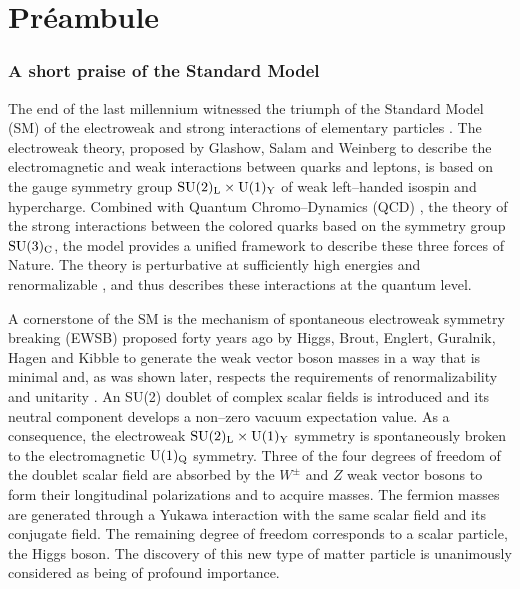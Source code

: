 \setcounter{section}{-1} 

\section{\hspace*{-.5cm} Pr\'eambule}

\subsubsection*{A short praise of the Standard Model}

The end of the last millennium witnessed the triumph of the Standard Model (SM)
of the electroweak and strong interactions of elementary particles
\cite{GSW,QCD}.  The electroweak theory, proposed by Glashow, Salam and
Weinberg \cite{GSW} to describe the electromagnetic \cite{QED} and weak
\cite{WEAK} interactions between quarks and leptons, is based on the gauge
symmetry group ${\rm SU(2)_L \times U(1)_Y}$ of weak left--handed isospin and
hypercharge. Combined with Quantum Chromo--Dynamics (QCD) \cite{QCD}, the
theory of the strong interactions between the colored quarks based on the 
symmetry group ${\rm SU(3)_C}$, the model provides a unified framework to
describe these three forces of Nature. The theory is perturbative at
sufficiently high energies \cite{QCD} and renormalizable \cite{RENORM}, and
thus describes these interactions at the quantum level.\s

A cornerstone of the SM is the mechanism of spontaneous electroweak symmetry
breaking (EWSB) proposed forty years ago by Higgs, Brout, Englert, Guralnik,
Hagen and Kibble \cite{Higgs} to generate the weak vector boson masses in a way
that is minimal and, as was shown later, respects the requirements of
renormalizability \cite{RENORM} and unitarity \cite{UNITARITY}.  An SU(2)
doublet of complex scalar fields is introduced and its neutral component
develops a non--zero vacuum expectation value. As a consequence, the
electroweak ${\rm SU(2)_L \times U(1)_Y}$ symmetry is spontaneously broken to
the electromagnetic ${\rm U(1)_Q}$ symmetry.  Three of the four degrees of
freedom of the doublet scalar field are absorbed by the $W^\pm$ and $Z$ weak
vector bosons to form their longitudinal polarizations and to acquire masses. 
The fermion masses are generated through a Yukawa interaction with the same
scalar field and its conjugate field.  The remaining degree of freedom
corresponds to a scalar particle, the Higgs boson. The discovery of this new
type of matter particle is unanimously considered as being of profound
importance.\s

